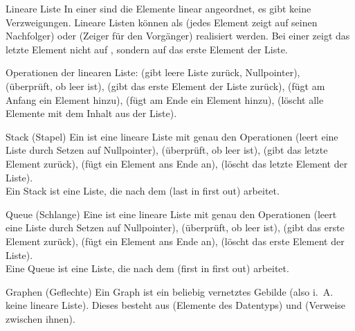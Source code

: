 \begin{Def}{Lineare Liste}
    In einer  sind die Elemente linear angeordnet, es
    gibt keine Verzweigungen. Lineare Listen können als 
    (jedes Element zeigt auf seinen Nachfolger) oder  (Zeiger für den Vorgänger) realisiert werden.
    Bei einer  zeigt das letzte Element nicht auf
    , sondern auf das erste Element der Liste.
    
    Operationen der linearen Liste:
     (gibt leere Liste zurück, Nullpointer),\\
     (überprüft, ob  leer ist),
     (gibt das erste Element der Liste zurück),
     (fügt am Anfang ein Element hinzu),
     (fügt am Ende ein Element hinzu),
     (löscht alle Elemente mit dem Inhalt aus der Liste).
\end{Def}

\begin{Def}{Stack (Stapel)}
    Ein  ist eine lineare Liste mit genau den Operationen
     (leert eine Liste durch Setzen auf Nullpointer),
     (überprüft, ob  leer ist),
     (gibt das letzte Element zurück),
     (fügt ein Element ans Ende an),
     (löscht das letzte Element der Liste). \\
    Ein Stack ist eine Liste, die nach dem 
    (last in first out) arbeitet.
\end{Def}

\begin{Def}{Queue (Schlange)}
    Eine  ist eine lineare Liste mit genau den Operationen
     (leert eine Liste durch Setzen auf Nullpointer),
     (überprüft, ob  leer ist),
     (gibt das erste Element zurück),
     (fügt ein Element ans Ende an),
     (löscht das erste Element der Liste). \\
    Eine Queue ist eine Liste, die nach dem 
    (first in first out) arbeitet.
\end{Def}

\begin{Def}{Graphen (Geflechte)}
    Ein Graph ist ein beliebig vernetztes Gebilde (also i.~A. keine lineare
    Liste). Dieses besteht aus  (Elemente des Datentyps) und
     (Verweise zwischen ihnen).
\end{Def}

